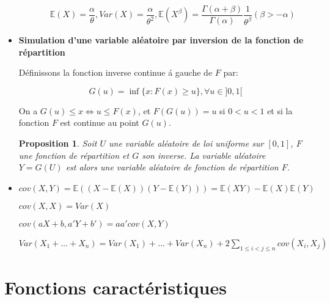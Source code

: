 \documentclass[10pt,a4paper,oneside]{article}
\newtheorem{proposition}{Proposition}
\begin{document}
\begin{itemize}
\begin{itemize}
\[ \mathbb{E}(X) = \frac{\alpha}{\theta}, Var(X) = \frac{\alpha}{\theta^2}, \mathbb{E}(X^\beta) = \frac{\Gamma(\alpha + \beta)}{\Gamma(\alpha)} \frac{1}{\theta^\beta} (\beta > -\alpha) \]

\end{itemize}

\item
\textbf{Simulation d'une variable al\'eatoire par inversion de la fonction de r\'epartition}

D\'efinissons la fonction inverse continue \'a gauche de $F$ par:

\[ G(u) = \inf \{ x : F(x) \geq u \}, \forall u \in ]0,1[ \]

On a $G(u) \leq x \Leftrightarrow u \leq F(x)$, et $F(G(u)) = u$ si $0 < u < 1$ et si la fonction $F$ est continue au point $G(u)$.

\begin{proposition}
Soit $U$ une variable al\'eatoire de loi uniforme sur $[0,1]$, $F$ une fonction de r\'epartition et $G$ son inverse. La variable al\'eatoire $Y = G(U)$ est alors une variable al\'eatoire de fonction de r\'epartition $F$.
\end{proposition}

\item
$cov(X,Y) = \mathbb{E}((X - \mathbb{E}(X))(Y - \mathbb{E}(Y))) = \mathbb{E}(XY) - \mathbb{E}(X)\mathbb{E}(Y)$

$cov(X,X) = Var(X)$

$cov(aX + b,a'Y + b') = aa'cov(X,Y)$

$Var(X_1 + \ldots + X_n) = Var(X_1) + \ldots + Var(X_n) + 2 \sum_{1 \leq i < j \leq n} cov(X_i,X_j)$

\end{itemize}

\section{Fonctions caractéristiques}
\end{document}
